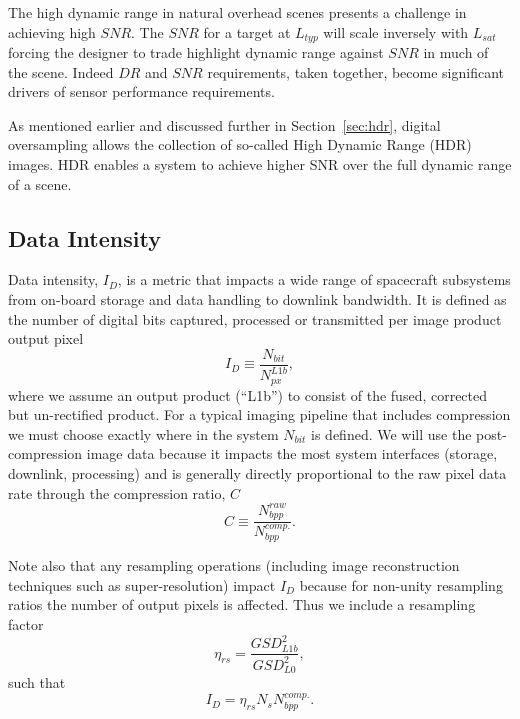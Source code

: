 \documentclass[]{spieman}  %
\begin{document}
The high dynamic range in natural overhead scenes presents a challenge in achieving high $SNR$.  The $SNR$ for a target at $L_{typ}$ will scale inversely with $L_{sat}$ forcing the designer to trade highlight dynamic range against $SNR$ in much of the scene.  Indeed $DR$ and $SNR$ requirements, taken together, become significant drivers of sensor performance requirements.

As mentioned earlier and discussed further in Section~\ref{sec:hdr}, digital oversampling allows the collection of so-called High Dynamic Range (HDR) images.  HDR enables a system to achieve higher SNR over the full dynamic range of a scene.

\subsection{Data Intensity}
\label{sec:data_intensity}
Data intensity, $I_D$, is a metric that impacts a wide range of spacecraft subsystems from on-board storage and data handling to downlink bandwidth.  It is defined as the number of digital bits captured, processed or transmitted per image product output pixel
\begin{equation}
    I_D \equiv \frac{N_{bit}}{N_{px}^{L1b}},
\end{equation}
where we assume an output product (``L1b'') to consist of the fused, corrected but un-rectified product. For a typical imaging pipeline that includes compression we must choose exactly where in the system $N_{bit}$ is defined.  We will use the post-compression image data because it impacts the most system interfaces (storage, downlink, processing) and is generally directly proportional to the raw pixel data rate through the compression ratio, $C$
\begin{equation*}
    \label{eq:compression}
    C \equiv \frac{N_{bpp}^{raw}}{N_{bpp}^{comp.}}.
\end{equation*}

Note also that any resampling operations (including image reconstruction techniques such as super-resolution) impact $I_D$ because for non-unity resampling ratios the number of output pixels is affected.  Thus we include a resampling factor
\begin{equation*}
    \eta_{rs} = \frac{GSD_{L1b}^2}{GSD_{L0}^2},
\end{equation*}
such that
\begin{equation}
    \label{eq:I_D}
    I_D = {\eta}_{rs} N_s N_{bpp}^{comp.}.
\end{equation}
\end{document}
